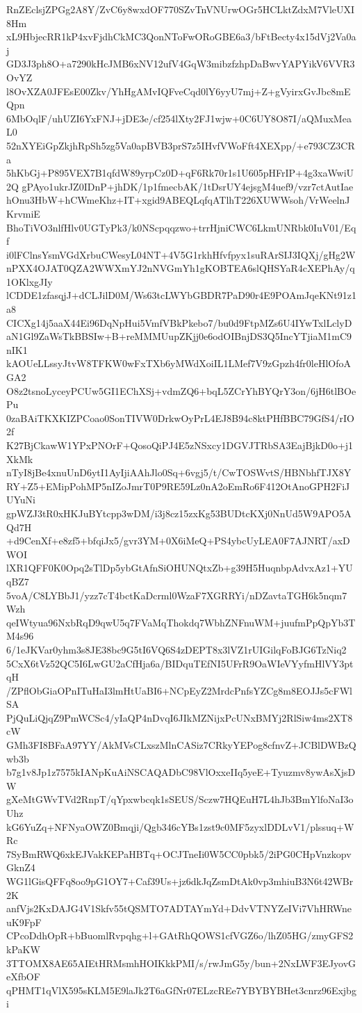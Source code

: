RnZEclsjZPGg2A8Y/ZvC6y8wxdOF770SZvTnVNUrwOGr5HCLktZdxM7VleUXI8Hm
xL9HbjecRR1kP4xvFjdhCkMC3QonNToFwORoGBE6a3/bFtBecty4x15dVj2Va0aj
GD3J3ph8O+a7290kHcJMB6xNV12ufV4GqW3mibzfzhpDaBwvYAPYikV6VVR3OvYZ
l8OvXZA0JFEsE00Zkv/YhHgAMvIQFveCqd0lY6yyU7mj+Z+gVyirxGvJbc8mEQpn
6MbOqlF/uhUZI6YxFNJ+jDE3e/cf254lXty2FJ1wjw+0C6UY8O87I/aQMuxMeaL0
52nXYEiGpZkjhRpSh5zg5Va0apBVB3prS7z5IHvfVWoFft4XEXpp/+e793CZ3CRa
5hKbGj+P895VEX7B1qfdW89yrpCz0D+qF6Rk70r1s1U605pHFrIP+4g3xaWwiU2Q
gPAyo1ukrJZ0IDnP+jhDK/1p1fmecbAK/1tDsrUY4ejsgM4uef9/vzr7ctAutIae
hOnu3HbW+hCWmeKhz+IT+xgid9ABEQLqfqATlhT226XUWWsoh/VrWeelnJKrvmiE
BhoTiVO3nlfHlv0UGTyPk3/k0NScpqqzwo+trrHjniCWC6LkmUNRbk0IuV01/Eqf
i0lFClnsYsmVGdXrbuCWesyL04NT+4V5G1rkhHfvfpyx1suRArSIJ3IQXj/gHg2W
nPXX4OJAT0QZA2WWXmYJ2nNVGmYh1gKOBTEA6slQHSYaR4cXEPhAy/q1OKlxgJIy
lCDDE1zfasqjJ+dCLJilD0M/Ws63tcLWYbGBDR7PaD90r4E9POAmJqeKNt91z1a8
CICXg14j5aaX44Ei96DqNpHui5VmfVBkPkebo7/bu0d9FtpMZs6U4IYwTxlLclyD
aN1Gl9ZaWsTkBBSIw+B+reMMMUupZKjj0e6odOIBnjDS3Q5IncYTjiaM1mC9nIK1
kAOUeLLssyJtvW8TFKW0wFxTXb6yMWdXoiIL1LMef7V9zGpzh4fr0leHlOfoAGA2
O8z2tsnoLyceyPCUw5GI1EChXSj+vdmZQ6+bqL5ZCrYhBYQrY3on/6jH6tlBOePu
0zaBAiTKXKIZPCoao0SonTIVW0DrkwOyPrL4EJ8B94c8ktPHfBBC79GfS4/rIO2f
K27BjCkawW1YPxPNOrF+QosoQiPJ4E5zNSxcy1DGVJTRbSA3EajBjkD0o+j1XkMk
nTyI8jBe4xnuUnD6ytI1AyIjiAAhJlo0Sq+6vgj5/t/CwTOSWvtS/HBNbhfTJX8Y
RY+Z5+EMipPohMP5nIZoJmrT0P9RE59Lz0nA2oEmRo6F412OtAnoGPH2FiJUYuNi
gpWZJ3tR0xHKJuBYtcpp3wDM/i3j8cz15zxKg53BUDtcKXj0NnUd5W9APO5AQd7H
+d9CenXf+e8zf5+bfqiJx5/gvr3YM+0X6iMeQ+PS4ybcUyLEA0F7AJNRT/axDWOI
lXR1QFF0K0Opq2sTlDp5ybGtAfnSiOHUNQtxZb+g39H5HuqnbpAdvxAz1+YUqBZ7
5voA/C8LYBbJ1/yzz7cT4bctKaDcrml0WzaF7XGRRYi/nDZavtaTGH6k5nqm7Wzh
qeIWtyua96NxbRqD9qwU5q7FVaMqThokdq7WbhZNFnuWM+juufmPpQpYb3TM4s96
6/1eJKVar0yhm3s8JE38bc9G5tI6VQ6S4zDEPT8x3lVZ1rUIGilqFoBJG6TzNiq2
5CxX6tVz52QC5I6LwGU2aCfHja6a/BIDquTEfNI5UFrR9OaWIeVYyfmHlVY3ptqH
/ZPflObGiaOPnITuHaI3lmHtUaBI6+NCpEyZ2MrdcPnfsYZCg8m8EOJJs5cFWlSA
PjQuLiQjqZ9PmWCSc4/yIaQP4nDvqI6JIkMZNijxPcUNxBMYj2RlSiw4ms2XT8cW
GMh3FI8BFaA97YY/AkMVsCLxszMlnCASiz7CRkyYEPog8cfnvZ+JCBlDWBzQwb3b
b7g1v8Jp1z7575kIANpKuAiNSCAQADbC98VlOxxeIIq5yeE+Tyuzmv8ywAsXjsDW
gXeMtGWvTVd2RnpT/qYpxwbcqk1sSEUS/Sczw7HQEuH7L4hJb3BmYlfoNaI3oUhz
kG6YuZq+NFNyaOWZ0Bmqji/Qgb346cYBs1zst9c0MF5zyxlDDLvV1/plssuq+WRc
7SyBmRWQ6xkEJVakKEPaHBTq+OCJTneIi0W5CC0pbk5/2iPG0CHpVnzkopvGknZ4
WG1lGisQFFq8oo9pG1OY7+Caf39Us+jz6dkJqZsmDtAk0vp3mhiuB3N6t42WBr2K
anfVjs2KxDAJG4V1Skfv55tQSMTO7ADTAYmYd+DdvVTNYZeIVi7VhHRWneuK9FpF
CPcoDdhOpR+bBuomlRvpqhg+l+GAtRhQOWS1cfVGZ6o/lhZ05HG/zmyGFS2kPaKW
3TTOMX8AE65AIEtHRMsmhHOIKkkPMI/s/rwJmG5y/bun+2NxLWF3EJyovGeXfbOF
qPHMT1qVlX595sKLM5E9laJk2T6aGfNr07ELzcREe7YBYBYBHet3cnrz96Exjbgi
